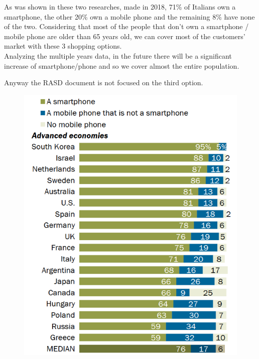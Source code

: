 As was shown in these two researches, made in 2018, 71\% of Italians own a smartphone, the other 20\% own a mobile phone and the remaining 8\% have none of the two.
Considering that most of the people that don't own a smartphone / mobile phone are older than 65 years old, we can cover most of the customers' market with these 3 shopping options.\\
Analyzing the multiple years data, in the future there will be a significant increase of smartphone/phone and so we cover almost the entire population.\par 
Anyway the RASD document is not focused on the third option.\par


\begin{figure}[H]
  \centering
  {\includegraphics[scale=0.50]{images/statistics_smartphone.png}}
  \hfill

\end{figure}
